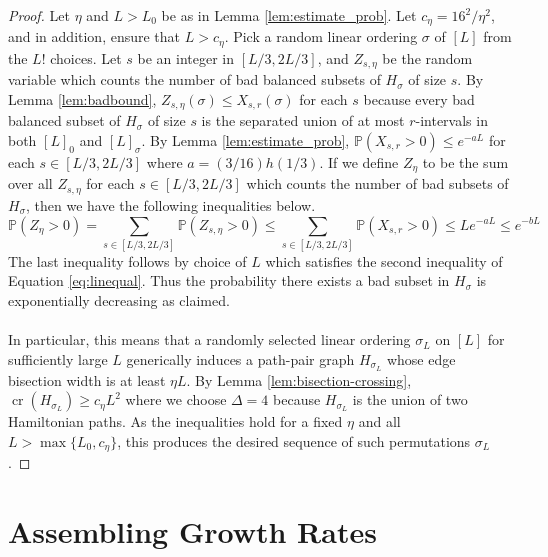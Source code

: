 \documentclass[11pt,a4paper]{amsart}
\theoremstyle{definition}
\theoremstyle{remark}
\DeclareMathOperator{\crn}{cr}
\newcommand{\Fpr}{\mathbb{P}}
\begin{document}
\begin{proof}
Let $\eta$ and $L > L_{0}$ be as in Lemma \ref{lem:estimate_prob}.  Let $c_{\eta} = 16^{2}/\eta^{2}$, and in addition, ensure that $L > c_{\eta}$.  Pick a random linear ordering $\sigma$ of $[L]$ from the $L!$ choices.  Let $s$ be an integer in $[L/3,2L/3]$, and $Z_{s,\eta}$ be the random variable which counts the number of bad balanced subsets of $H_{\sigma}$ of size $s$.  By Lemma \ref{lem:badbound}, $Z_{s,\eta}(\sigma) \leq X_{s,r}(\sigma)$ for each $s$ because every bad balanced subset of $H_{\sigma}$ of size $s$ is the separated union of at most $r$-intervals in both $[L]_{0}$ and $[L]_{\sigma}$.  By Lemma \ref{lem:estimate_prob}, $\Fpr(X_{s,r} > 0) \leq e^{-aL}$ for each $s \in [L/3,2L/3]$ where $a = (3/16) h(1/3)$.  If we define $Z_{\eta}$ to be the sum over all $Z_{s,\eta}$ for each $s \in [L/3,2L/3]$ which counts the number of bad subsets of $H_{\sigma}$, then we have the following inequalities below.
\begin{equation*}
\Fpr\left(Z_{\eta} > 0\right) = \sum_{s \in [L/3,2L/3]} \Fpr\left(Z_{s,\eta} > 0 \right) \leq \sum_{s \in [L/3,2L/3]} \Fpr\left(X_{s,r} > 0 \right) \leq Le^{-aL} \leq e^{-bL}
\end{equation*}
The last inequality follows by choice of $L$ which satisfies the second inequality of Equation \ref{eq:linequal}.  Thus the probability there exists a bad subset in $H_{\sigma}$ is exponentially decreasing as claimed.  \\
\\
In particular, this means that a randomly selected linear ordering $\sigma_{L}$ on $[L]$ for sufficiently large $L$ generically induces a path-pair graph $H_{\sigma_{L}}$ whose edge bisection width is at least $\eta L$.  By Lemma \ref{lem:bisection-crossing}, $\crn(H_{\sigma_{L}}) \geq c_{\eta} L^{2}$ where we choose $\Delta = 4$ because $H_{\sigma_{L}}$ is the union of two Hamiltonian paths.  As the inequalities hold for a fixed $\eta$ and all $L > \max\{L_{0},c_{\eta}\}$, this produces the desired sequence of such permutations $\sigma_{L}$.  
\end{proof}


\section{Assembling Growth Rates}
\label{sec:growthrates}
\end{document}
